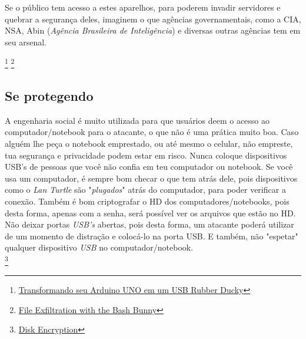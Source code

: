 \documentclass[12pt, letterpaper, Monospace:12]{report}
\begin{document}
	Se o público tem acesso a estes aparelhos, para poderem invadir servidores e quebrar a segurança deles, imaginem o que agências governamentais, como a CIA, NSA, Abin (\textit{Agência Brasileira de Inteligência}) e diversas outras agências tem em seu arsenal.

\footnote{\href{http://pythoneiro.blogspot.com.br/2015/04/transformando-seu-arduino-uno-em-um-usb.html?ref=@pr1v8}{Transformando seu Arduino UNO em um USB Rubber Ducky}}
\footnote{\href{http://brianlam.me/blog/file-exfiltration-with-the-bash-bunny}{File Exfiltration with the Bash Bunny}}
\pagebreak

	\subsection{Se protegendo}
		A engenharia social é muito utilizada para que usuários deem o acesso ao computador/notebook para o atacante, o que não é uma prática muito boa. Caso alguém lhe peça o notebook emprestado, ou até mesmo o celular, não empreste, tua segurança e privacidade podem estar em risco. Nunca coloque dispositivos USB's de pessoas que você não confia em teu computador ou notebook. Se você usa um computador, é sempre bom checar o que tem atrás dele, pois dispositivos como o \textit{Lan Turtle} são "\textit{plugados}" atrás do computador, para poder verificar a conexão. Também é bom criptografar o HD dos computadores/notebooks, pois desta forma, apenas com a senha, será possível ver os arquivos que estão no HD.\\

	Não deixar portas \textit{USB's} abertas, pois desta forma, um atacante poderá utilizar de um momento de distração e colocá-lo na porta USB. E também, não "espetar" qualquer dispositivo \textit{USB} no computador/notebook.\\

\footnote{\href{https://wiki.archlinux.org/index.php/Disk_encryption}{Disk Encryption}}
\pagebreak
\end{document}
